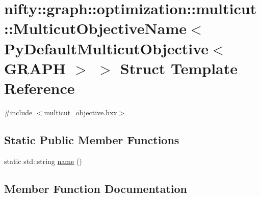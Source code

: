 \hypertarget{structnifty_1_1graph_1_1optimization_1_1multicut_1_1MulticutObjectiveName_3_01PyDefaultMulticutObjective_3_01GRAPH_01_4_01_4}{}\section{nifty\+:\+:graph\+:\+:optimization\+:\+:multicut\+:\+:Multicut\+Objective\+Name$<$ Py\+Default\+Multicut\+Objective$<$ G\+R\+A\+P\+H $>$ $>$ Struct Template Reference}
\label{structnifty_1_1graph_1_1optimization_1_1multicut_1_1MulticutObjectiveName_3_01PyDefaultMulticutObjective_3_01GRAPH_01_4_01_4}


{\ttfamily \#include $<$multicut\+\_\+objective.\+hxx$>$}

\subsection*{Static Public Member Functions}
\begin{DoxyCompactItemize}
\item 
static std\+::string \hyperlink{structnifty_1_1graph_1_1optimization_1_1multicut_1_1MulticutObjectiveName_3_01PyDefaultMulticutObjective_3_01GRAPH_01_4_01_4_aa07312c8bed49034064f20743fbccd4c}{name} ()
\end{DoxyCompactItemize}


\subsection{Member Function Documentation}
\hypertarget{structnifty_1_1graph_1_1optimization_1_1multicut_1_1MulticutObjectiveName_3_01PyDefaultMulticutObjective_3_01GRAPH_01_4_01_4_aa07312c8bed49034064f20743fbccd4c}{}
